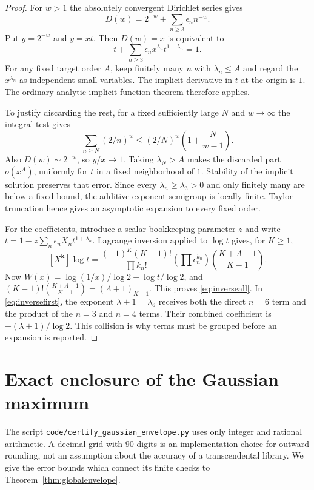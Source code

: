 \documentclass[11pt,a4paper]{article}
\numberwithin{equation}{section}
\theoremstyle{definition}
\theoremstyle{remark}
\begin{document}
\begin{proof}
For $w>1$ the absolutely convergent Dirichlet series gives
\[
 D(w)=2^{-w}+\sum_{n\ge3}\epsilon_n n^{-w}.
\]
Put $y=2^{-w}$ and $y=xt$. Then $D(w)=x$ is equivalent to
\begin{equation}\label{eq:timplicit}
 t+\sum_{n\ge3}\epsilon_n x^{\lambda_n}t^{1+\lambda_n}=1.
\end{equation}
For any fixed target order $A$, keep finitely many $n$ with
$\lambda_n\le A$ and regard the $x^{\lambda_n}$ as independent small
variables. The implicit derivative in $t$ at the origin is $1$.
The ordinary analytic implicit-function theorem therefore applies.

To justify discarding the rest, for a fixed sufficiently large $N$ and
$w\to\infty$ the integral test gives
\[
 \sum_{n\ge N}(2/n)^w
 \le(2/N)^w\left(1+\frac{N}{w-1}\right).
\]
Also $D(w)\sim2^{-w}$, so $y/x\to1$. Taking $\lambda_N>A$ makes
the discarded part $o(x^A)$, uniformly for $t$ in a fixed neighborhood
of $1$. Stability of the implicit solution preserves that error.
Since every $\lambda_n\ge\lambda_3>0$ and only finitely many are
below a fixed bound, the additive exponent semigroup is locally finite.
Taylor truncation hence gives an asymptotic expansion to every fixed order.

For the coefficients, introduce a scalar bookkeeping parameter $z$ and
write $t=1-z\sum_n\epsilon_n X_nt^{1+\lambda_n}$. Lagrange inversion
applied to $\log t$ gives, for $K\ge1$,
\[
 [X^{\mathbf k}]\log t
 =\frac{(-1)^K(K-1)!}{\prod k_n!}
   \left(\prod\epsilon_n^{k_n}\right)
   \binom{K+\Lambda-1}{K-1}.
\]
Now $W(x)=\log(1/x)/\log2-\log t/\log2$, and
$(K-1)!\binom{K+\Lambda-1}{K-1}=(\Lambda+1)_{K-1}$.
This proves \eqref{eq:inverseall}. In \eqref{eq:inversefirst}, the
exponent $\lambda+1=\lambda_6$ receives both the direct $n=6$ term
and the product of the $n=3$ and $n=4$ terms. Their combined coefficient
is $-(\lambda+1)/\log2$. This collision is why terms must be grouped
before an expansion is reported.
\end{proof}

\section{Exact enclosure of the Gaussian maximum}
\label{sec:gausscertificate}

The script \texttt{code/certify\_gaussian\_envelope.py} uses only
integer and rational arithmetic. A decimal grid with 90 digits is an
implementation choice for outward rounding, not an assumption about
the accuracy of a transcendental library. We give the error bounds
which connect its finite checks to Theorem~\ref{thm:globalenvelope}.
\end{document}
